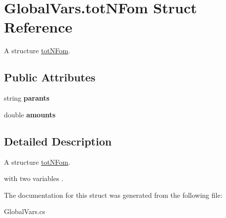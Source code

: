 \hypertarget{struct_global_vars_1_1tot_n_fom}{}\section{Global\+Vars.\+tot\+N\+Fom Struct Reference}
\label{struct_global_vars_1_1tot_n_fom}


A structure \mbox{\hyperlink{struct_global_vars_1_1tot_n_fom}{tot\+N\+Fom}}.  


\subsection*{Public Attributes}
\begin{DoxyCompactItemize}
\item 
\mbox{\label{struct_global_vars_1_1tot_n_fom_afc083b03e428bdece54c2231920f3cdd}} 
string {\bfseries parants}
\item 
\mbox{\label{struct_global_vars_1_1tot_n_fom_a6f74d5f693087dbf383f90028bfc748a}} 
double {\bfseries amounts}
\end{DoxyCompactItemize}


\subsection{Detailed Description}
A structure \mbox{\hyperlink{struct_global_vars_1_1tot_n_fom}{tot\+N\+Fom}}. 

with two variables . 

The documentation for this struct was generated from the following file\+:\begin{DoxyCompactItemize}
\item 
Global\+Vars.\+cs\end{DoxyCompactItemize}
